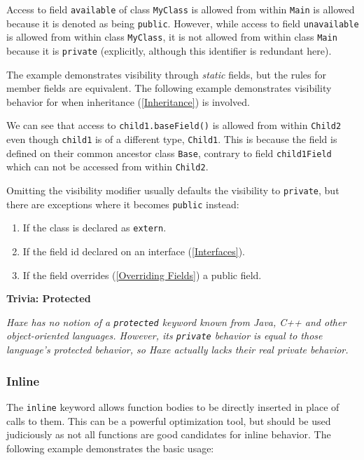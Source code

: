 \documentclass{article}
\newcommand{\type}[1]{\texttt{#1}}
\newcommand{\expr}[1]{\texttt{#1}}
\newenvironment{myshaded}
  {\def\FrameCommand{\fboxsep=\topsep\colorbox{bgcolor}}%
  \MakeFramed {\advance\hsize-\width \FrameRestore}}%
 {\endMakeFramed}
\newcommand{\trivia}[2]
	{\begin{myshaded}\noindent\textbf{Trivia: #1}\par\nobreak\noindent\ignorespaces\textit{#2}\end{myshaded}}
\newcommand{\tref}[2]{#1 (\ref{#2})}
\begin{document}


Access to field \expr{available} of class \type{MyClass} is allowed from within \type{Main} is allowed because it is denoted as being \expr{public}. However, while access to field \expr{unavailable} is allowed from within class \type{MyClass}, it is not allowed from within class \type{Main} because it is \expr{private} (explicitly, although this identifier is redundant here).

The example demonstrates visibility through \emph{static} fields, but the rules for member fields are equivalent. The following example demonstrates visibility behavior for when \tref{inheritance}{Inheritance} is involved.



We can see that access to \expr{child1.baseField()} is allowed from within \type{Child2} even though \expr{child1} is of a different type, \type{Child1}. This is because the field is defined on their common ancestor class \type{Base}, contrary to field \expr{child1Field} which can not be accessed from within \type{Child2}.

Omitting the visibility modifier usually defaults the visibility to \expr{private}, but there are exceptions where it becomes \expr{public} instead:

\begin{enumerate}
	\item If the class is declared as \expr{extern}.
	\item If the field id declared on an \tref{interface}{Interfaces}.
	\item If the field \tref{overrides}{Overriding Fields} a public field.
\end{enumerate}

\trivia{Protected}{Haxe has no notion of a \expr{protected} keyword known from Java, C++ and other object-oriented languages. However, its \expr{private} behavior is equal to those language's protected behavior, so Haxe actually lacks their real private behavior.}

\subsubsection{Inline}
\label{Inline}

The \expr{inline} keyword allows function bodies to be directly inserted in place of calls to them. This can be a powerful optimization tool, but should be used judiciously as not all functions are good candidates for inline behavior. The following example demonstrates the basic usage:
\end{document}
